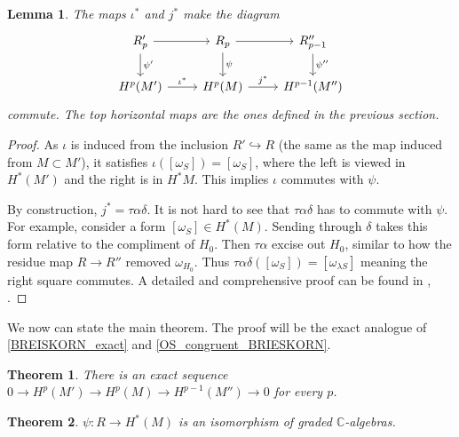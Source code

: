 \documentclass[article,twoside]{article}
\newcommand{\CC}{\mathbb{C}}
\theoremstyle{plain}
\newtheorem{theorem}{Theorem}[section]
\theoremstyle{plain}
\newtheorem{lemma}[lemma]{Lemma}
\theoremstyle{plain}
\theoremstyle{plain}
\theoremstyle{plain}
\theoremstyle{definition}
\theoremstyle{definition}
\theoremstyle{definition}
\theoremstyle{remark}
\theoremstyle{remark}
\begin{document}
\begin{lemma}\label{commutativity_psi_i_j}
	The maps $\iota^*$ and $j^*$ make the diagram
	\begin{equation*}
		\begin{tikzcd}
		 R_p'\rar\dar{\psi'} & R_p\rar\dar{\psi} & R_{p-1}''\dar{\psi''}
		\\
		H^p(M')\rar{\iota^*} & H^p(M)\rar{j^*} & H^{p-1}(M'')
		\end{tikzcd}
	\end{equation*}
	commute. The top horizontal maps are the ones defined in the previous section.
\end{lemma}
\begin{proof}
	As $\iota$ is induced from the inclusion $R'\hookrightarrow R$ (the same as the map induced from $M\subset M'$), it satisfies $\iota([\omega_S]) = [\omega_S]$, where the left is viewed in $H^*(M')$ and the right is in $H^*{M}$. This implies $\iota$ commutes with $\psi$.

	By construction, $j^*=\tau\alpha\delta$. It is not hard to see that $\tau\alpha\delta$ has to commute with $\psi$. For example, consider a form $[\omega_S]\in H^*(M)$. Sending through $\delta$ takes this form relative to the compliment of $H_0$. Then $\tau\alpha$ excise out $H_0$, similar to how the residue map $R\to R''$ removed $\omega_{H_0}$. Thus $\tau\alpha\delta([\omega_S]) = [\omega_{\lambda S}]$ meaning the right square commutes. A detailed and comprehensive proof can be found in \cite{orlik_terao}, \cite{sergey}.
\end{proof}

We now can state the main theorem. The proof will be the exact analogue of \autoref{BREISKORN_exact} and \autoref{OS_congruent_BRIESKORN}.

\begin{theorem}
	There is an exact sequence $0\to H^p(M')\to H^p(M) \to H^{p-1}(M'')\to 0$ for every $p$.
\end{theorem}

\begin{theorem}
	$\psi:R\to H^*(M)$ is an isomorphism of graded $\CC$-algebras.
\end{theorem}
\end{document}
